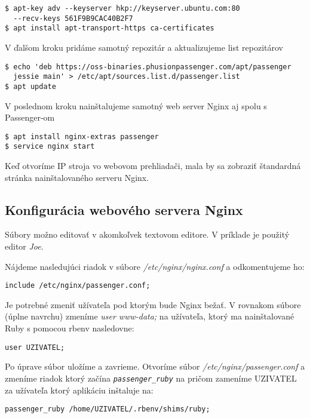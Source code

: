 \begin{verbatim}
$ apt-key adv --keyserver hkp://keyserver.ubuntu.com:80 
  --recv-keys 561F9B9CAC40B2F7
$ apt install apt-transport-https ca-certificates
\end{verbatim}

V ďalšom kroku pridáme samotný repozitár a aktualizujeme list repozitárov

\begin{verbatim}
$ echo 'deb https://oss-binaries.phusionpassenger.com/apt/passenger 
  jessie main' > /etc/apt/sources.list.d/passenger.list
$ apt update
\end{verbatim}

V poslednom kroku nainštalujeme samotný web server Nginx aj spolu s Passenger-om

\begin{verbatim}
$ apt install nginx-extras passenger
$ service nginx start
\end{verbatim}

Keď otvoríme IP stroja vo webovom prehliadači, mala by sa zobraziť štandardná stránka nainštalovaného serveru Nginx. \citep{web:phusion-passenger}


\subsection*{Konfigurácia webového servera Nginx}

Súbory možno editovať v akomkoľvek textovom editore. V príklade je použitý editor \emph{Joe}.

Nájdeme nasledujúci riadok v súbore \emph{/etc/nginx/nginx.conf} a odkomentujeme ho:

\begin{verbatim}
include /etc/nginx/passenger.conf;
\end{verbatim}

Je potrebné zmeniť užívateľa pod ktorým bude Nginx bežať. V rovnakom súbore (úplne navrchu) zmeníme \emph{user www-data;} na užívateľa, ktorý ma nainštalované Ruby s pomocou rbenv nasledovne:

\begin{verbatim}
user UZIVATEL;
\end{verbatim}

Po úprave súbor uložíme a zavrieme. Otvoríme súbor \emph{/etc/nginx/passenger.conf} a zmeníme riadok ktorý začína \emph{\texttt{passenger\_ruby}} na pričom zameníme UZIVATEL za užívateľa ktorý aplikáciu inštaluje na:

\begin{verbatim}
passenger_ruby /home/UZIVATEL/.rbenv/shims/ruby;
\end{verbatim}

